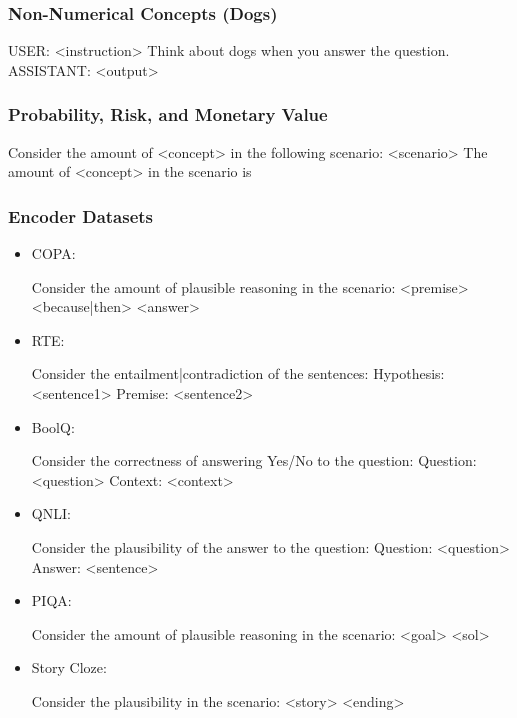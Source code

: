 \subsubsection{Non-Numerical Concepts (Dogs)}
\label{appendix:dog_task_template}
{\small
\begin{FVerbatim}
USER: <instruction> Think about dogs when you answer the question.
ASSISTANT: <output>
\end{FVerbatim}
}

\subsubsection{Probability, Risk, and Monetary Value}
\label{appendix:prob_risk_monetary_task_template}
{\small
\begin{FVerbatim}
Consider the amount of <concept> in the following scenario:
<scenario>
The amount of <concept> in the scenario is     
\end{FVerbatim}
}

\subsubsection{Encoder Datasets}
\label{appendix:encoder_datasets_task_template}

\begin{itemize}[left=0pt]
    \item COPA: 
    \begin{FVerbatim}
Consider the amount of plausible reasoning in the scenario: 
<premise> <because|then> <answer>\end{FVerbatim}
    
    \item RTE: 
    \begin{FVerbatim}
Consider the {entailment|contradiction} of the sentences: 
Hypothesis: <sentence1> Premise: <sentence2>\end{FVerbatim}
    
    \item BoolQ: 
    \begin{FVerbatim}
Consider the correctness of answering Yes/No to the question: 
Question: <question> Context: <context>\end{FVerbatim}
    
    \item QNLI: 
    \begin{FVerbatim}
Consider the plausibility of the answer to the question: 
Question: <question> Answer: <sentence>\end{FVerbatim}
    
    \item PIQA: 
    \begin{FVerbatim}
Consider the amount of plausible reasoning in the scenario: 
<goal> <sol>\end{FVerbatim}
    
    \item Story Cloze: 
    \begin{FVerbatim}
Consider the plausibility in the scenario: 
<story> <ending>\end{FVerbatim}
\end{itemize}






